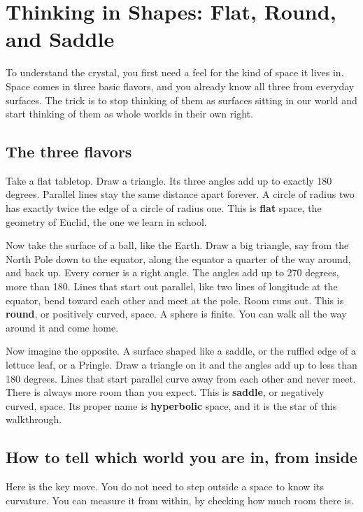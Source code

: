 \section{Thinking in Shapes: Flat, Round, and Saddle}

To understand the crystal, you first need a feel for the kind of space it lives in. Space comes in three basic flavors, and you already know all three from everyday surfaces. The trick is to stop thinking of them as surfaces sitting in our world and start thinking of them as whole worlds in their own right.

\subsection{The three flavors}

Take a flat tabletop. Draw a triangle. Its three angles add up to exactly 180 degrees. Parallel lines stay the same distance apart forever. A circle of radius two has exactly twice the edge of a circle of radius one. This is \textbf{flat} space, the geometry of Euclid, the one we learn in school.

Now take the surface of a ball, like the Earth. Draw a big triangle, say from the North Pole down to the equator, along the equator a quarter of the way around, and back up. Every corner is a right angle. The angles add up to 270 degrees, more than 180. Lines that start out parallel, like two lines of longitude at the equator, bend toward each other and meet at the pole. Room runs out. This is \textbf{round}, or positively curved, space. A sphere is finite. You can walk all the way around it and come home.

Now imagine the opposite. A surface shaped like a saddle, or the ruffled edge of a lettuce leaf, or a Pringle. Draw a triangle on it and the angles add up to less than 180 degrees. Lines that start parallel curve away from each other and never meet. There is always more room than you expect. This is \textbf{saddle}, or negatively curved, space. Its proper name is \textbf{hyperbolic} space, and it is the star of this walkthrough.

\subsection{How to tell which world you are in, from inside}

Here is the key move. You do not need to step outside a space to know its curvature. You can measure it from within, by checking how much room there is.

